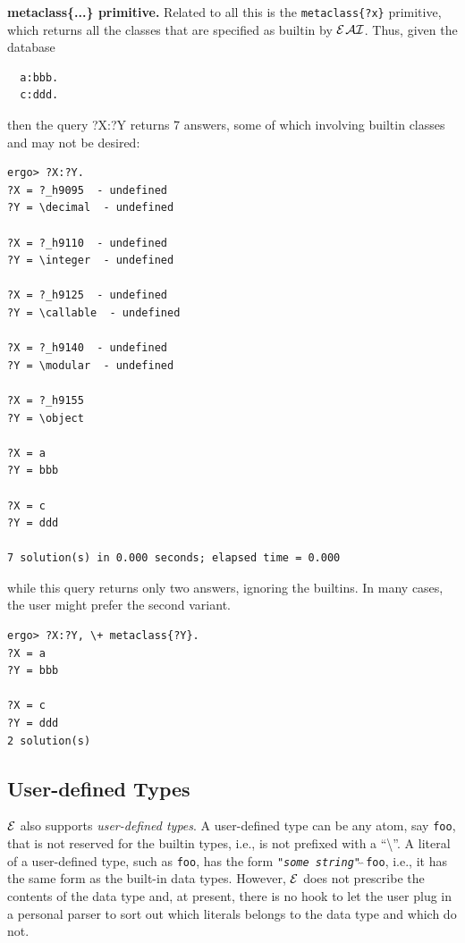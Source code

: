 \documentclass[11pt]{article}
\newcommand{\ERGO}{\mbox{\ensuremath{\cal{E}}\smaller{{\sc{RGO}}}}\xspace}
\newcommand{\ERGOAI}{\mbox{{\ensuremath{\cal{E}}\smaller{{\sc{RGO}}}}\ensuremath{\cal{AI}}}\xspace}
\newcommand{\FLSYSTEM}{\ERGO}
\newcommand{\bs}{\textbackslash}
\begin{document}
\noindent
{}
\textbf{metaclass\{...\} primitive.}   
Related to all this is the \texttt{metaclass\{?x\}} primitive, which
returns all the classes that are specified as builtin by \ERGOAI.
Thus, given the database
\begin{verbatim}
  a:bbb.
  c:ddd.
\end{verbatim}
then the query ?X:?Y returns 7 answers, some of which involving builtin classes 
and may not be desired:
\begin{verbatim}
ergo> ?X:?Y.
?X = ?_h9095  - undefined
?Y = \decimal  - undefined

?X = ?_h9110  - undefined
?Y = \integer  - undefined

?X = ?_h9125  - undefined
?Y = \callable  - undefined

?X = ?_h9140  - undefined
?Y = \modular  - undefined

?X = ?_h9155
?Y = \object

?X = a
?Y = bbb

?X = c
?Y = ddd

7 solution(s) in 0.000 seconds; elapsed time = 0.000
\end{verbatim}
while this query returns only two answers, ignoring the builtins. In many cases,
the user might prefer the second variant.
\begin{verbatim}
ergo> ?X:?Y, \+ metaclass{?Y}.
?X = a
?Y = bbb

?X = c
?Y = ddd
2 solution(s) 
\end{verbatim}



\subsection{User-defined Types}\label{sec-udt}

\FLSYSTEM also supports \emph{user-defined types}. A user-defined type can
be any atom, say \texttt{foo}, that is not reserved for the builtin types,
i.e., is not prefixed with a ``\bs''. A literal of a user-defined type,
such as \texttt{foo}, has the form 
\texttt{"\textnormal{\textit{some string}}"$\hat{~}\hat{~}$foo}, i.e., it
has the same form as the built-in data types. However, \FLSYSTEM does not
prescribe the contents of the data type and, at present, there is no hook
to let the user plug in a personal parser to sort out which literals
belongs to the data type and which do not.
\end{document}
